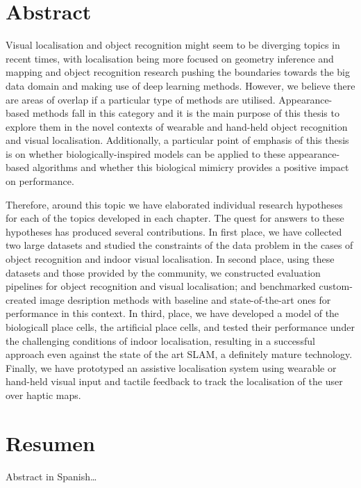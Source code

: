 \begingroup
\let\clearpage\relax
\let\cleardoublepage\relax
\let\cleardoublepage\relax

\chapter*{Abstract}

Visual localisation and object recognition might seem to be diverging topics in recent times, with localisation being more focused on geometry inference and mapping and object recognition research pushing the boundaries towards the big data domain and making use of deep learning methods. However, we believe there are areas of overlap if a particular type of methods are utilised. Appearance-based methods fall in this category and it is the main purpose of this thesis to explore them in the novel contexts of wearable and hand-held object recognition and visual localisation. Additionally, a particular point of emphasis of this thesis is on whether biologically-inspired models can be applied to these appearance-based algorithms and whether this biological mimicry provides a positive impact on performance.

Therefore, around this topic we have elaborated individual research hypotheses for each of the topics developed in each chapter. The quest for answers to these hypotheses has produced several contributions. In first place, we have collected two large datasets and studied the constraints of the data problem in the cases of object recognition and indoor visual localisation. In second place, using these datasets and those provided by the community, we constructed evaluation pipelines for object recognition and visual localisation; and benchmarked custom-created image desription methods with baseline and state-of-the-art ones for performance in this context. In third, place, we have developed a model of the biologicall place cells, the artificial place cells, and tested their performance under the challenging conditions of indoor localisation, resulting in a successful approach even against the state of the art SLAM, a definitely mature technology. Finally, we have prototyped an assistive localisation system using wearable or hand-held visual input and tactile feedback to track the localisation of the user over haptic maps.


\vfill

\chapter*{Resumen}
Abstract in Spanish\dots


\endgroup			

\vfill